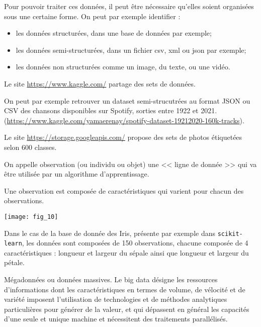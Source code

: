 Pour pouvoir traiter ces données, il peut être nécessaire qu'elles soient organisées sous une certaine forme. On peut par exemple identifier : 
\begin{itemize}
\item les données structurées, dans une base de données par exemple;
\item les données semi-structurées, dans un fichier csv, xml ou json par exemple;
\item les données non structurées comme un image, du texte, ou une vidéo.
\end{itemize}

\begin{exemple}
Le site \url{https://www.kaggle.com/} partage des sets de données. 

On peut par exemple retrouver un dataset semi-strucutrées au format JSON ou CSV des chansons disponibles sur Spotify, sorties entre 1922 et 2021. 
(\url{https://www.kaggle.com/yamaerenay/spotify-dataset-19212020-160k-tracks}).

Le site \url{https://storage.googleapis.com/} propose des sets de photos étiquetées selon 600 classes. 
\end{exemple}

\begin{defi}

On appelle observation (ou individu ou objet) une << ligne de donnée >> qui va être utilisée par un algorithme d'apprentissage. 

Une observation est composée de caractéristiques qui varient pour chacun des observations. 
\end{defi}


\begin{marginfigure}
\centering
\texttt{[image: fig\_10]}
\end{marginfigure}

\begin{exemple}
Dans le cas de la base de donnée des Iris, présente par exemple dans \texttt{scikit-learn}, les données sont composées de 150 observations, chacune composée de 4 caractéristiques : longueur et largeur du sépale ainsi que longueur et largeur du pétale.
\end{exemple}


\begin{defi}
Mégadonnées ou données massives. Le big data désigne les ressources d’informations dont les caractéristiques en termes de volume, de vélocité et de variété imposent l’utilisation de technologies et de méthodes analytiques particulières pour générer de la valeur, et qui dépassent en général les capacités d'une seule et unique machine et nécessitent des traitements parallélisés.
\end{defi}


